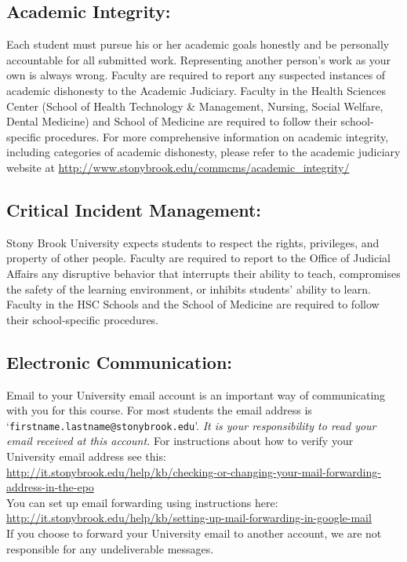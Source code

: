 \documentclass[11pt]{article}
\begin{document}
\subsection*{Academic Integrity: }

\noindent Each student must pursue his or her academic goals honestly
and be personally accountable for all submitted work.  Representing
another person's work as your own is always wrong.  Faculty are
required to report any suspected instances of academic dishonesty to
the Academic Judiciary. Faculty in the Health Sciences Center (School
of Health Technology \& Management, Nursing, Social Welfare, Dental
Medicine) and School of Medicine are required to follow their
school-specific procedures. For more comprehensive information on
academic integrity, including categories of academic dishonesty,
please refer to the academic judiciary website at
\url{http://www.stonybrook.edu/commcms/academic_integrity/}



\subsection*{Critical Incident Management: }

\noindent Stony Brook University expects students to respect the
rights, privileges, and property of other people. Faculty are required
to report to the Office of Judicial Affairs any disruptive behavior
that interrupts their ability to teach, compromises the safety of the
learning environment, or inhibits students' ability to learn.  Faculty
in the HSC Schools and the School of Medicine are required to follow
their school-specific procedures.



\subsection*{Electronic Communication: }

\noindent Email to your University email account is an important way
of communicating with you for this course.  For most students the
email address is `{\tt firstname.lastname@stonybrook.edu}'.
{\em It is your responsibility to read your email received at this
  account.}  For instructions about how to verify your University
email address see this: \\[0.25em]
\url{http://it.stonybrook.edu/help/kb/checking-or-changing-your-mail-forwarding-address-in-the-epo}
\\[0.25em]
%
You can set up email forwarding using instructions here: \\[0.25em]
\url{http://it.stonybrook.edu/help/kb/setting-up-mail-forwarding-in-google-mail}
\\[0.25em]
%
If you choose to forward your University email to another account, we
are not responsible for any undeliverable messages.
\end{document}
